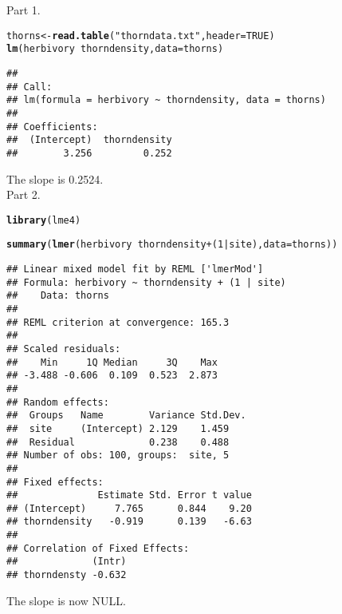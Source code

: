 \documentclass[12pt,a4paper]{scrartcl}\usepackage[]{graphicx}\usepackage[]{color}
\makeatletter
\newcommand{\hlnum}[1]{\textcolor[rgb]{0.686,0.059,0.569}{#1}}%
\newcommand{\hlstr}[1]{\textcolor[rgb]{0.192,0.494,0.8}{#1}}%
\newcommand{\hlopt}[1]{\textcolor[rgb]{0,0,0}{#1}}%
\newcommand{\hlstd}[1]{\textcolor[rgb]{0.345,0.345,0.345}{#1}}%
\newcommand{\hlkwb}[1]{\textcolor[rgb]{0.69,0.353,0.396}{#1}}%
\newcommand{\hlkwc}[1]{\textcolor[rgb]{0.333,0.667,0.333}{#1}}%
\newcommand{\hlkwd}[1]{\textcolor[rgb]{0.737,0.353,0.396}{\textbf{#1}}}%
\newenvironment{kframe}{%
 \def\at@end@of@kframe{}%
 \ifinner\ifhmode%
  \def\at@end@of@kframe{\end{minipage}}%
  \begin{minipage}{\columnwidth}%
 \fi\fi%
 \def\FrameCommand##1{\hskip\@totalleftmargin \hskip-\fboxsep
 \colorbox{shadecolor}{##1}\hskip-\fboxsep
     \hskip-\linewidth \hskip-\@totalleftmargin \hskip\columnwidth}%
 \MakeFramed {\advance\hsize-\width
   \@totalleftmargin\z@ \linewidth\hsize
   \@setminipage}}%
 {\par\unskip\endMakeFramed%
 \at@end@of@kframe}
\newenvironment{knitrout}{}{} %
\makeatother
\begin{document}
\begin{Answer}
Part 1.
\begin{knitrout}
\color{fgcolor}\begin{kframe}
\begin{alltt}
\hlstd{thorns} \hlkwb{<-} \hlkwd{read.table}\hlstd{(}\hlstr{"thorndata.txt"}\hlstd{,} \hlkwc{header} \hlstd{=} \hlnum{TRUE}\hlstd{)}
\hlkwd{lm}\hlstd{(herbivory} \hlopt{~} \hlstd{thorndensity,} \hlkwc{data}\hlstd{=thorns)}
\end{alltt}
\begin{verbatim}
## 
## Call:
## lm(formula = herbivory ~ thorndensity, data = thorns)
## 
## Coefficients:
##  (Intercept)  thorndensity  
##        3.256         0.252
\end{verbatim}
\end{kframe}
\end{knitrout}
The slope is 0.2524.\\

Part 2.
\begin{knitrout}
\color{fgcolor}\begin{kframe}
\begin{alltt}
\hlkwd{library}\hlstd{(lme4)}
\end{alltt}


{\ttfamily\noindent\itshape\color{messagecolor}{\#\# Loading required package: Matrix}}\begin{alltt}
\hlkwd{summary}\hlstd{(}\hlkwd{lmer}\hlstd{(herbivory} \hlopt{~} \hlstd{thorndensity} \hlopt{+} \hlstd{(}\hlnum{1}\hlopt{|}\hlstd{site),} \hlkwc{data}\hlstd{=thorns))}
\end{alltt}
\begin{verbatim}
## Linear mixed model fit by REML ['lmerMod']
## Formula: herbivory ~ thorndensity + (1 | site)
##    Data: thorns
## 
## REML criterion at convergence: 165.3
## 
## Scaled residuals: 
##    Min     1Q Median     3Q    Max 
## -3.488 -0.606  0.109  0.523  2.873 
## 
## Random effects:
##  Groups   Name        Variance Std.Dev.
##  site     (Intercept) 2.129    1.459   
##  Residual             0.238    0.488   
## Number of obs: 100, groups:  site, 5
## 
## Fixed effects:
##              Estimate Std. Error t value
## (Intercept)     7.765      0.844    9.20
## thorndensity   -0.919      0.139   -6.63
## 
## Correlation of Fixed Effects:
##             (Intr)
## thorndensty -0.632
\end{verbatim}
\end{kframe}
\end{knitrout}
The slope is now NULL.\\


\end{Answer}
\end{document}
